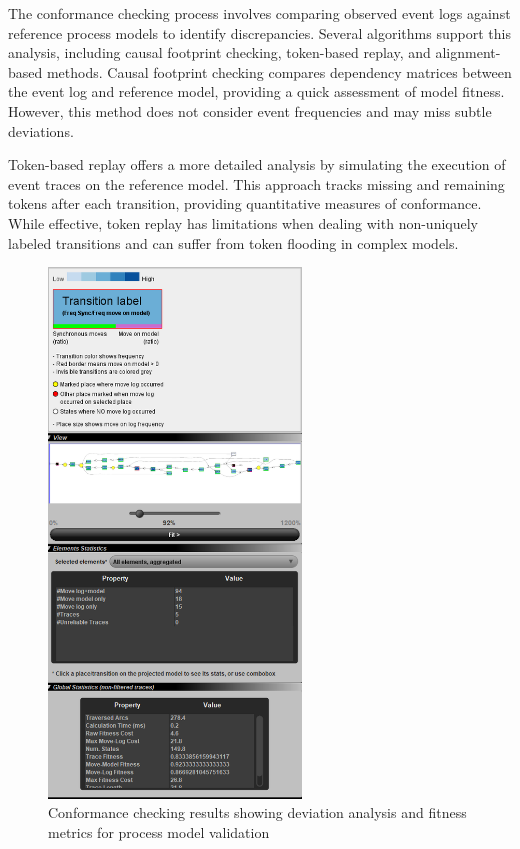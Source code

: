 The conformance checking process involves comparing observed event logs against reference process models to identify discrepancies. Several algorithms support this analysis, including causal footprint checking, token-based replay, and alignment-based methods. Causal footprint checking compares dependency matrices between the event log and reference model, providing a quick assessment of model fitness. However, this method does not consider event frequencies and may miss subtle deviations.

Token-based replay offers a more detailed analysis by simulating the execution of event traces on the reference model. This approach tracks missing and remaining tokens after each transition, providing quantitative measures of conformance. While effective, token replay has limitations when dealing with non-uniquely labeled transitions and can suffer from token flooding in complex models.

\begin{figure}[h]
    \centering
    \includegraphics[width=0.6\textwidth]{MX_Papers/Paper5/images/stat1.PNG}
    \caption{Conformance checking results showing deviation analysis and fitness metrics for process model validation}
    \label{fig:conformance_checking_results}
\end{figure}


